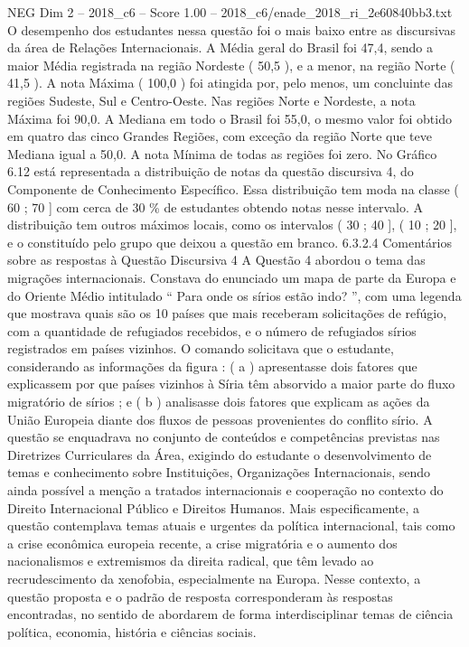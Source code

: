 \begin{textsample}{NEG Dim 2 – 2018\_c6 – Score 1.00 – 2018\_c6/enade\_2018\_ri\_2e60840bb3.txt}
O desempenho dos estudantes nessa questão foi o mais baixo entre as discursivas da área de Relações Internacionais.
A Média geral do Brasil foi 47,4, sendo a maior Média registrada na região Nordeste ( 50,5 ), e a menor, na região Norte ( 41,5 ).
A nota Máxima ( 100,0 ) foi atingida por, pelo menos, um concluinte das regiões Sudeste, Sul e Centro-Oeste.
Nas regiões Norte e Nordeste, a nota Máxima foi 90,0.
A Mediana em todo o Brasil foi 55,0, o mesmo valor foi obtido em quatro das cinco Grandes Regiões, com exceção da região Norte que teve Mediana igual a 50,0.
A nota Mínima de todas as regiões foi zero.
No Gráfico 6.12 está representada a distribuição de notas da questão discursiva 4, do Componente de Conhecimento Específico.
Essa distribuição tem moda na classe ( 60 ; 70 ] com cerca de 30 \% de estudantes obtendo notas nesse intervalo.
A distribuição tem outros máximos locais, como os intervalos ( 30 ; 40 ], ( 10 ; 20 ], e o constituído pelo grupo que deixou a questão em branco. 6.3.2.4 Comentários sobre as respostas à Questão Discursiva 4 A Questão 4 abordou o tema das migrações internacionais.
Constava do enunciado um mapa de parte da Europa e do Oriente Médio intitulado “ Para onde os sírios estão indo? ”, com uma legenda que mostrava quais são os 10 países que mais receberam solicitações de refúgio, com a quantidade de refugiados recebidos, e o número de refugiados sírios registrados em países vizinhos.
O comando solicitava que o estudante, considerando as informações da figura : ( a ) apresentasse dois fatores que explicassem por que países vizinhos à Síria têm absorvido a maior parte do fluxo migratório de sírios ; e ( b ) analisasse dois fatores que explicam as ações da União Europeia diante dos fluxos de pessoas provenientes do conflito sírio.
A questão se enquadrava no conjunto de conteúdos e competências previstas nas Diretrizes Curriculares da Área, exigindo do estudante o desenvolvimento de temas e conhecimento sobre Instituições, Organizações Internacionais, sendo ainda possível a menção a tratados internacionais e cooperação no contexto do Direito Internacional Público e Direitos Humanos.
Mais especificamente, a questão contemplava temas atuais e urgentes da política internacional, tais como a crise econômica europeia recente, a crise migratória e o aumento dos nacionalismos e extremismos da direita radical, que têm levado ao recrudescimento da xenofobia, especialmente na Europa.
Nesse contexto, a questão proposta e o padrão de resposta corresponderam às respostas encontradas, no sentido de abordarem de forma interdisciplinar temas de ciência política, economia, história e ciências sociais.

\end{textsample}
